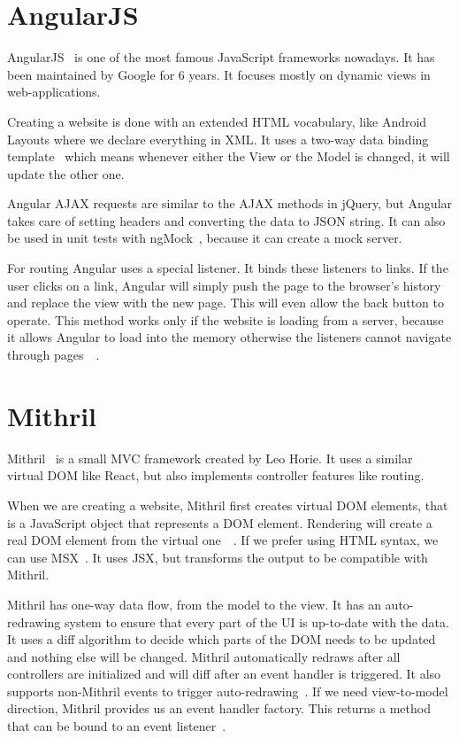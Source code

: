 \section{AngularJS}

AngularJS~\cite{Angular} is one of the most famous JavaScript frameworks nowadays.  It has been maintained by Google for 6 years. It focuses mostly on dynamic views in web-applications. 

Creating a website is done with an extended HTML vocabulary, like Android Layouts where we declare everything in XML.  It uses a two-way data binding template~\cite{Angular-Developer-DataBinding} which means whenever either the View or the Model is changed, it will update the other one.

Angular AJAX requests are similar to the AJAX methods in jQuery, but Angular takes care of setting headers and converting the data to JSON string. It can also be used in unit tests with ngMock~\cite{Angular-AJAX}, because it can create a mock server. 

For routing Angular uses a special listener. It binds these listeners to links. If the user clicks on a link, Angular will simply push the page to the browser's history and replace the view with the new page. This will even allow the back button to operate. This method works only if the website is loading from a server, because it allows Angular to load into the memory otherwise the listeners cannot navigate through pages~\cite{Angular-Location}~\cite{Angular-Location2}.

\section{Mithril}

Mithril~\cite{Mithril} is a small MVC framework created by Leo Horie. It uses a similar virtual DOM like React, but also implements controller features like routing.

When we are creating a website, Mithril first creates virtual DOM elements, that is a JavaScript object that represents a DOM element. Rendering will create a real DOM element from the virtual one~\cite{Mithril-m}~\cite{Mithril-render}. If we prefer using HTML syntax, we can use MSX~\cite{MSX}. It uses JSX, but transforms the output to be compatible with Mithril. 

Mithril has one-way data flow, from the model to the view. It has an auto-redrawing system to ensure that every part of the UI is up-to-date with the data. It uses a diff algorithm to decide which parts of the DOM needs to be updated and nothing else will be changed. Mithril automatically redraws after all controllers are initialized and will diff after an event handler is triggered. It also supports non-Mithril events to trigger auto-redrawing~\cite{Mithril-redraw}. If we need view-to-model direction, Mithril provides us an event handler factory. This returns a method that can be bound to an event listener~\cite{Mithril-withAttr}.


